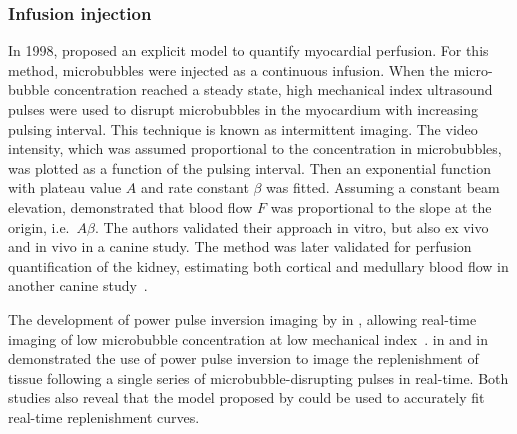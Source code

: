 \subsubsection{Infusion injection}
In 1998, \citet{Wei:1998jd} proposed an explicit model to quantify myocardial perfusion. %
For this method, microbubbles were injected as a continuous infusion.
When the micro-bubble concentration reached a steady state, high mechanical index ultrasound pulses were used to disrupt microbubbles in the myocardium with increasing pulsing interval.
This technique is known as intermittent imaging.
The video intensity, which was assumed proportional to the concentration in microbubbles, was plotted as a function of the pulsing interval. 
Then an exponential function with plateau value $A$ and rate constant $\beta$ was fitted. 
Assuming a constant beam elevation, \citet{Wei:1998jd} demonstrated that blood flow $F$ was proportional to the slope at the origin, i.e.~$A\beta$.
The authors validated their approach in vitro, but also ex vivo and in vivo in a canine study.
The method was later validated for perfusion quantification of the kidney, estimating both cortical and medullary blood flow in another canine study~\cite{Wei:2001id}. %

The development of power pulse inversion imaging by \citet{Simpson:1997jn} in \citeyear{Simpson:1997jn}, %
allowing real-time imaging of low microbubble concentration at low mechanical index~\cite{Tiemann:1999vy}. %
\citet{Tiemann:1999vy} in \citeyear{Tiemann:1999vy} %
and \citet{Masugata:2001vg} in \citeyear{Masugata:2001vg} %
demonstrated the use of power pulse inversion to image the replenishment of tissue following a single series of microbubble-disrupting pulses in real-time.
Both studies also reveal that the model proposed by \citet{Wei:1998jd} could be used to accurately fit real-time replenishment curves.

